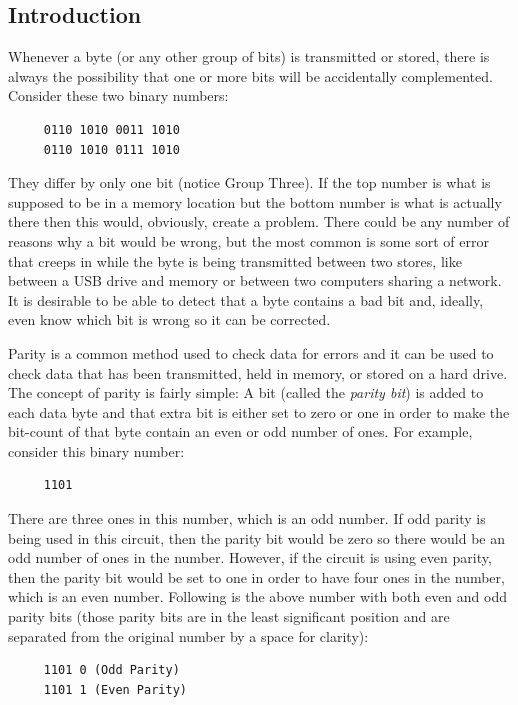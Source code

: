 \subsection{Introduction}
\label{CL:subsec:introduction_to_error_detection}

Whenever a byte (or any other group of bits) is transmitted or stored, there is always the possibility that one or more bits will be accidentally complemented. Consider these two binary numbers:

\begin{verbatim}
     0110 1010 0011 1010
     0110 1010 0111 1010
\end{verbatim} 

They differ by only one bit (notice Group Three). If the top number is what is supposed to be in a memory location but the bottom number is what is actually there then this would, obviously, create a problem. There could be any number of reasons why a bit would be wrong, but the most common is some sort of error that creeps in while the byte is being transmitted between two stores, like between a \ac{USB} drive and memory or between two computers sharing a network. It is desirable to be able to detect that a byte contains a bad bit and, ideally, even know which bit is wrong so it can be corrected. 

Parity is a common method used to check data for errors and it can be used to check data that has been transmitted, held in memory, or stored on a hard drive. The concept of parity is fairly simple: A bit (called the \emph{parity bit}) is added to each data byte and that extra bit is either set to zero or one in order to make the bit-count of that byte contain an even or odd number of ones. For example, consider this binary number: 

\begin{verbatim}
     1101
\end{verbatim}

There are three ones in this number, which is an odd number. If odd parity is being used in this circuit, then the parity bit would be zero so there would be an odd number of ones in the number. However, if the circuit is using even parity, then the parity bit would be set to one in order to have four ones in the number, which is an even number. Following is the above number with both even and odd parity bits (those parity bits are in the least significant position and are separated from the original number by a space for clarity): 

\begin{verbatim}
     1101 0 (Odd Parity)
     1101 1 (Even Parity)
\end{verbatim}

